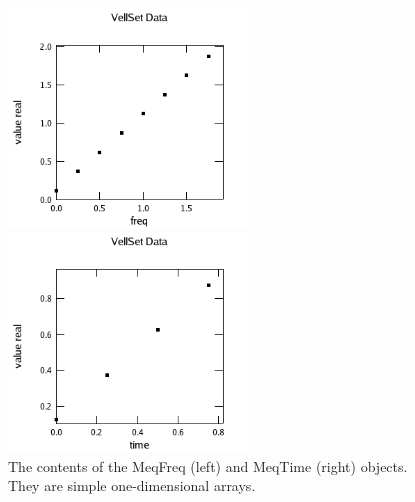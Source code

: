 \documentclass[10pt]{article}
\begin{document}
\begin{figure}
  \centering
  \begin{minipage}[c]{0.5\textwidth}
     \centering \includegraphics[width=2.5in]{Figures/freq}
  \end{minipage}%
  \begin{minipage}[c]{0.5\textwidth}
     \centering \includegraphics[width=2.5in]{Figures/time}
  \end{minipage}
  \caption {The contents of the MeqFreq (left) and MeqTime (right) objects.
  They are simple one-dimensional arrays.} 
  \label{fig:freq}
\end{figure}
\end{document}
